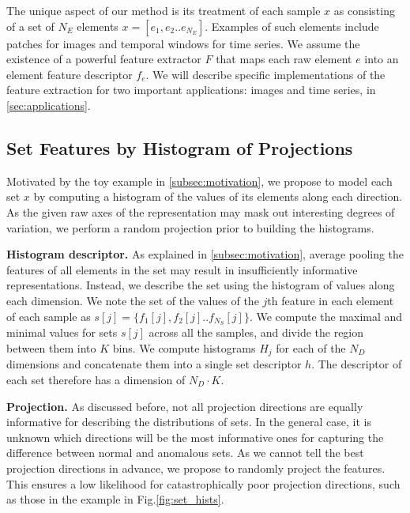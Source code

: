\documentclass{article}
\begin{document}
The unique aspect of our method is its treatment of each sample $x$ as consisting of a set of $N_E$ elements $x = [e_1,e_2..e_{N_E}]$. Examples of such elements include patches for images and temporal windows for time series. We assume the existence of a powerful feature extractor $F$ that maps each raw element $e$ into an element feature descriptor $f_e$. We will describe specific implementations of the feature extraction for two important applications: images and time series, in \cref{sec:applications}.   








\subsection{Set Features by Histogram of Projections} 
\label{subsec:method_proj}

Motivated by the toy example in \cref{subsec:motivation}, we propose to model each set $x$ by computing a histogram of the values of its elements along each direction. As the given raw axes of the representation may mask out interesting degrees of variation, we perform a random projection prior to building the histograms.  

\textbf{Histogram descriptor.} As explained in \cref{subsec:motivation}, average pooling the features of all elements in the set may result in insufficiently informative representations. Instead, we describe the set using the histogram of values along each dimension. We note the set of the values of the $j$th feature in each element of each sample as $s[j] = \{f_1[j],f_2[j]..f_{N_S}[j]\}$. We compute the maximal and minimal values for sets $s[j]$ across all the samples, and divide the region between them into $K$ bins. We compute histograms $H_j$ for each of the $N_D$ dimensions and concatenate them into a single set descriptor $h$. The descriptor of each set therefore has a dimension of $N_D \cdot K$.    

\textbf{Projection.} As discussed before, not all projection directions are equally informative for describing the distributions of sets. In the general case, it is unknown which directions will be the most informative ones for capturing the difference between normal and anomalous sets. As we cannot tell the best projection directions in advance, we propose to randomly project the features. This ensures a low likelihood for catastrophically poor projection directions, such as those in the example in Fig.\ref{fig:set_hists}.
\end{document}
